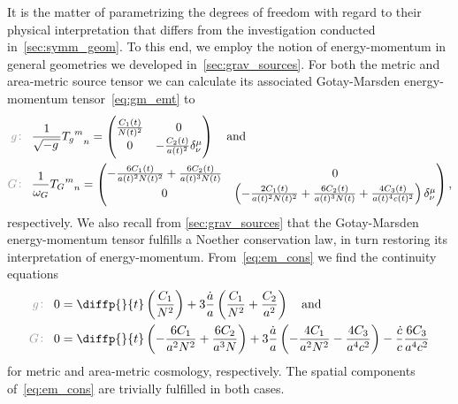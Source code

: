 
It is the matter of parametrizing the degrees of freedom with regard to their physical interpretation that differs from the investigation conducted in~\autoref{sec:symm_geom}. To this end, we employ the notion of energy-momentum in general geometries we developed in~\autoref{sec:grav_sources}. For both the metric and area-metric source tensor we can calculate its associated Gotay-Marsden energy-momentum tensor~\eqref{eq:gm_emt} to
\begin{align}
	\metind &\frac{1}{\sqrtmet}{{\EMt_\met}^m}_n=\begin{pmatrix}
		\frac{\Const_1\oft}{\Nlapse\oft^2} & 0 \\
		0 & -\frac{\Const_2\oft}{\scalea\oft^2}\krond^\mu_\nu
	\end{pmatrix}\label{eq:em_met_raw} \quad \text{and}\\
	\armetind &\frac{1}{\volel_\armet}{{\EMt_\armet}^m}_n=\begin{pmatrix}
		-\frac{6\Const_1\oft}{\scalea\oft^2\Nlapse\oft^2}+\frac{6\Const_2\oft}{\scalea\oft^3\Nlapse\oft} & 0 \\
		0 & \left(-\frac{2\Const_1\oft}{\scalea\oft^2\Nlapse\oft^2}+\frac{6\Const_2\oft}{\scalea\oft^3\Nlapse\oft}+\frac{4\Const_3\oft}{\scalea\oft^4\scalec\oft^2}\right)\krond^\mu_\nu
	\end{pmatrix}\label{eq:em_armet_raw}
	\eqpunct{,}
\end{align}
respectively. We also recall from \autoref{sec:grav_sources} that the Gotay-Marsden energy-momentum tensor fulfills a Noether conservation law, in turn restoring its interpretation of energy-momentum. From~\eqref{eq:em_cons} we find the continuity equations
\begin{align}
	\metind 0&=\diffp{}{t}\left(\frac{\Const_1}{\Nlapse^2}\right)+3\frac{\dt{\scalea}}{\scalea}\left(\frac{\Const_1}{\Nlapse^2}+\frac{\Const_2}{\scalea^2}\right) \quad \text{and}\label{eq:cosmo_cont_met_raw}\\
	\armetind 0&=\diffp{}{t}\left(-\frac{6\Const_1}{\scalea^2\Nlapse^2}+\frac{6\Const_2}{\scalea^3\Nlapse}\right)+3\frac{\dt{\scalea}}{\scalea}\left(-\frac{4\Const_1}{\scalea^2\Nlapse^2}-\frac{4\Const_3}{\scalea^4\scalec^2}\right)-\frac{\dt{\scalec}}{\scalec}\frac{6\Const_3}{\scalea^4\scalec^2}\label{eq:cosmo_cont_armet_raw}
\end{align}
for metric and area-metric cosmology, respectively. The spatial components of~\eqref{eq:em_cons} are trivially fulfilled in both cases.

